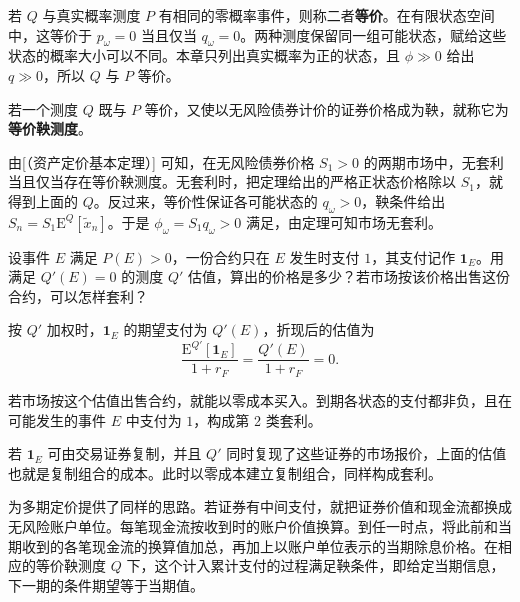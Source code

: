 \begin{tcolorbox}[knowledge,title=等价鞅测度]
若 $Q$ 与真实概率测度 $P$ 有相同的零概率事件，则称二者\textbf{等价}。在有限状态空间中，这等价于 $p_\omega=0$ 当且仅当 $q_\omega=0$。两种测度保留同一组可能状态，赋给这些状态的概率大小可以不同。本章只列出真实概率为正的状态，且 $\phi\gg0$ 给出 $q\gg0$，所以 $Q$ 与 $P$ 等价。

若一个测度 $Q$ 既与 $P$ 等价，又使以无风险债券计价的证券价格成为鞅，就称它为\textbf{等价鞅测度}。
\end{tcolorbox}

由[（资产定价基本定理）] 可知，在无风险债券价格 $S_1>0$ 的两期市场中，无套利当且仅当存在等价鞅测度。无套利时，把定理给出的严格正状态价格除以 $S_1$，就得到上面的 $Q$。反过来，等价性保证各可能状态的 $q_\omega>0$，鞅条件给出 $S_n=S_1\mathrm E^Q[\tilde x_n]$。于是 $\phi_\omega=S_1q_\omega>0$ 满足，由定理可知市场无套利。

\begin{tcolorbox}[example,title=课堂例题：零概率与状态支付]
\begin{question}
设事件 $E$ 满足 $P(E)>0$，一份合约只在 $E$ 发生时支付 $1$，其支付记作 $\mathbf1_E$。用满足 $Q'(E)=0$ 的测度 $Q'$ 估值，算出的价格是多少？若市场按该价格出售这份合约，可以怎样套利？
\end{question}
\begin{solution}
按 $Q'$ 加权时，$\mathbf1_E$ 的期望支付为 $Q'(E)$，折现后的估值为
\[
 \frac{\mathrm E^{Q'}[\mathbf1_E]}{1+r_F}
 =\frac{Q'(E)}{1+r_F}=0.
\]

若市场按这个估值出售合约，就能以零成本买入。到期各状态的支付都非负，且在可能发生的事件 $E$ 中支付为 $1$，构成第 2 类套利。

若 $\mathbf1_E$ 可由交易证券复制，并且 $Q'$ 同时复现了这些证券的市场报价，上面的估值也就是复制组合的成本。此时以零成本建立复制组合，同样构成套利。
\end{solution}
\end{tcolorbox}

 为多期定价提供了同样的思路。若证券有中间支付，就把证券价值和现金流都换成无风险账户单位。每笔现金流按收到时的账户价值换算。到任一时点，将此前和当期收到的各笔现金流的换算值加总，再加上以账户单位表示的当期除息价格。在相应的等价鞅测度 $Q$ 下，这个计入累计支付的过程满足鞅条件，即给定当期信息，下一期的条件期望等于当期值。

